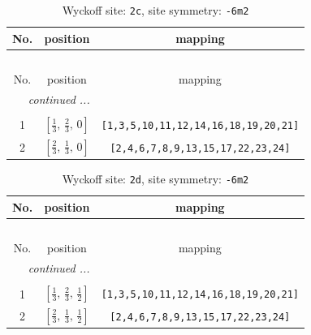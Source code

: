 \documentclass[fleqn,8pt]{jsarticle}
\begin{document}
\begin{longtable}{ccc}
\caption{Wyckoff site: {\tt 2c}, site symmetry: {\tt -6m2}}
 \\
 \hline \hline
No. & position & mapping \\ \hline \endfirsthead

\multicolumn{2}{l}{\tablename\ \thetable{}} \\
 \hline \hline
No. & position & mapping \\ \hline \endhead

 \hline \hline
\multicolumn{2}{r}{\footnotesize\it continued ...} \\ \endfoot

 \hline \hline
\multicolumn{2}{r}{} \\ \endlastfoot

1 & $\left[ \frac{1}{3},\, \frac{2}{3},\, 0 \right]$ & {\tt [1,3,5,10,11,12,14,16,18,19,20,21]} \\ \hline
2 & $\left[ \frac{2}{3},\, \frac{1}{3},\, 0 \right]$ & {\tt [2,4,6,7,8,9,13,15,17,22,23,24]} \\
\end{longtable}
\renewcommand{\arraystretch}{1.2}
\begin{longtable}{ccc}
\caption{Wyckoff site: {\tt 2d}, site symmetry: {\tt -6m2}}
 \\
 \hline \hline
No. & position & mapping \\ \hline \endfirsthead

\multicolumn{2}{l}{\tablename\ \thetable{}} \\
 \hline \hline
No. & position & mapping \\ \hline \endhead

 \hline \hline
\multicolumn{2}{r}{\footnotesize\it continued ...} \\ \endfoot

 \hline \hline
\multicolumn{2}{r}{} \\ \endlastfoot

1 & $\left[ \frac{1}{3},\, \frac{2}{3},\, \frac{1}{2} \right]$ & {\tt [1,3,5,10,11,12,14,16,18,19,20,21]} \\ \hline
2 & $\left[ \frac{2}{3},\, \frac{1}{3},\, \frac{1}{2} \right]$ & {\tt [2,4,6,7,8,9,13,15,17,22,23,24]} \\
\end{longtable}
\renewcommand{\arraystretch}{1.2}
\end{document}
